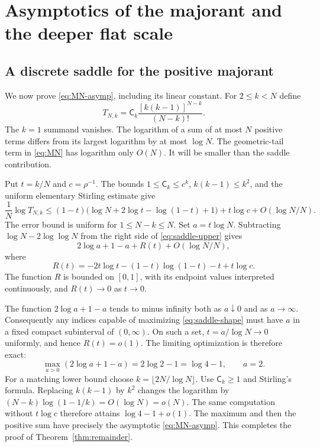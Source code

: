 \documentclass[11pt,a4paper]{article}
\numberwithin{equation}{section}
\theoremstyle{definition}
\theoremstyle{remark}
\newcommand{\sh}{\mathsf C}
\begin{document}
\section{Asymptotics of the majorant and the deeper flat scale}
\label{sec:majorant}

\subsection{A discrete saddle for the positive majorant}
We now prove \eqref{eq:MN-asymp}, including its linear constant.
For $2\le k<N$ define
\[
 T_{N,k}=\sh_k\frac{[k(k-1)]^{N-k}}{(N-k)!}.
\]
The $k=1$ summand vanishes.  The logarithm of a sum of at most $N$ positive
terms differs from its largest logarithm by at most $\log N$.
The geometric-tail term in \eqref{eq:MN} has logarithm only $O(N)$.
It will be smaller than the saddle contribution.

Put $t=k/N$ and $c=\rho^{-1}$.  The bounds
$1\le\sh_k\le c^k$, $k(k-1)\le k^2$, and the uniform elementary
Stirling estimate give
\begin{equation}
 \frac1N\log T_{N,k}
 \le(1-t)\bigl(\log N+2\log t-\log(1-t)+1\bigr)
       +t\log c+O(\log N/N).
 \label{eq:saddle-upper}
\end{equation}
The error bound is uniform for $1\le N-k\le N$.
Set $a=t\log N$.  Subtracting
$\log N-2\log\log N$ from the right side of
\eqref{eq:saddle-upper} gives
\begin{equation}
 2\log a+1-a+R(t)+O(\log N/N),
 \label{eq:saddle-shape}
\end{equation}
where
\[
 R(t)=-2t\log t-(1-t)\log(1-t)-t+t\log c.
\]
The function $R$ is bounded on $[0,1]$, with its endpoint values interpreted
continuously, and $R(t)\to0$ as $t\to0$.

The function $2\log a+1-a$ tends to minus infinity both as
$a\downarrow0$ and as $a\to\infty$.  Consequently any indices capable of
maximizing \eqref{eq:saddle-shape} must have $a$ in a fixed compact
subinterval of $(0,\infty)$.  On such a set,
$t=a/\log N\to0$ uniformly, and hence $R(t)=o(1)$.
The limiting optimization is therefore exact:
\[
 \max_{a>0}(2\log a+1-a)=2\log2-1=\log4-1,
 \qquad a=2.
\]
For a matching lower bound choose
$k=\lfloor2N/\log N\rfloor$.  Use $\sh_k\ge1$ and Stirling's formula.
Replacing $k(k-1)$ by $k^2$ changes the logarithm by
$(N-k)\log(1-1/k)=O(\log N)=o(N)$.
The same computation without $t\log c$ therefore attains
$\log4-1+o(1)$.  The maximum and then the positive sum have precisely the
asymptotic \eqref{eq:MN-asymp}.  This completes the proof of
Theorem~\ref{thm:remainder}.
\end{document}
